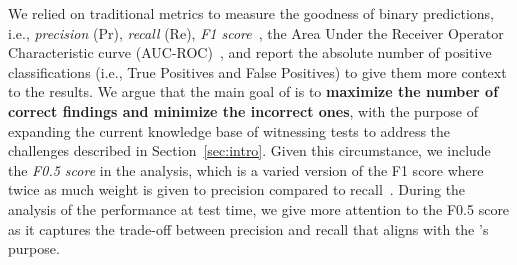We relied on traditional metrics to measure the goodness of binary predictions, i.e., \textit{precision} (Pr), \textit{recall} (Re), \textit{F1 score}~\cite{powers:2011:precision:recall,baeza:1999:modern:information:retrieval}, the Area Under the Receiver Operator Characteristic curve (AUC-ROC)~\cite{Junge2018:roc}, and report the absolute number of positive classifications (i.e., True Positives and False Positives) to give them more context to the results.
%
We argue that the main goal of \vuteco is to \textbf{maximize the number of correct findings and minimize the incorrect ones}, with the purpose of expanding the current knowledge base of witnessing tests to address the challenges described in Section~\ref{sec:intro}.
Given this circumstance, we include the \textit{F0.5 score} in the analysis, which is a varied version of the F1 score where twice as much weight is given to precision compared to recall~\cite{van1979:information:retrieval}.
During the analysis of the performance at test time, we give more attention to the F0.5 score as it captures the trade-off between precision and recall that aligns with the \vuteco's purpose.



